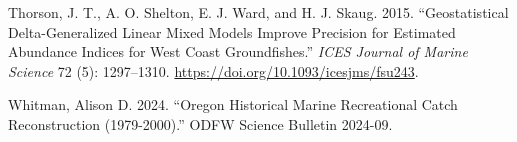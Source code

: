\documentclass[
]{scrartcl}
\newlength{\cslhangindent}
\newenvironment{CSLReferences}[2] %
 {\begin{list}{}{%
  \setlength{\itemindent}{0pt}
  \setlength{\leftmargin}{0pt}
  \setlength{\parsep}{0pt}
  \ifodd #1
   \setlength{\leftmargin}{\cslhangindent}
   \setlength{\itemindent}{-1\cslhangindent}
  \fi
  \setlength{\itemsep}{#2\baselineskip}}}
 {\end{list}}
\begin{document}
\begin{CSLReferences}{1}{0}
Thorson, J. T., A. O. Shelton, E. J. Ward, and H. J. Skaug. 2015.
{``Geostatistical Delta-Generalized Linear Mixed Models Improve
Precision for Estimated Abundance Indices for {West} {Coast}
Groundfishes.''} \emph{ICES Journal of Marine Science} 72 (5):
1297--1310. \url{https://doi.org/10.1093/icesjms/fsu243}.

Whitman, Alison D. 2024. {``Oregon Historical Marine Recreational Catch
Reconstruction (1979-2000).''} ODFW Science Bulletin 2024-09.

\end{CSLReferences}
\end{document}

